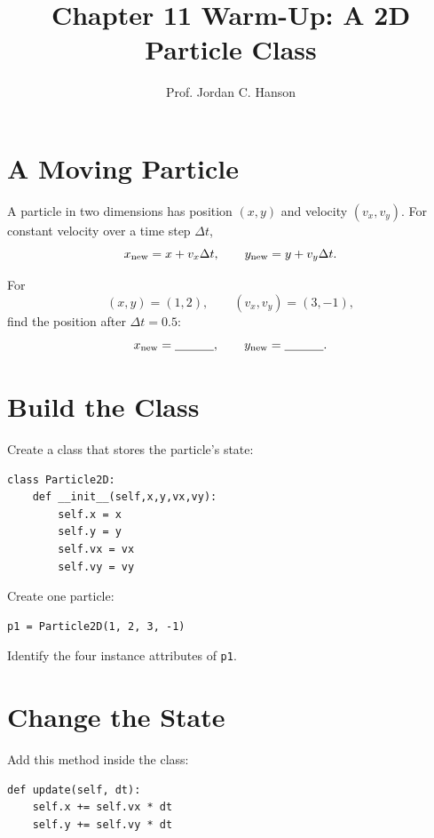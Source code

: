 \documentclass{article}
\begin{document}
\twocolumn

\title{Chapter 11 Warm-Up: A 2D Particle Class}
\author{Prof. Jordan C. Hanson}
\date{}

\maketitle

\section{A Moving Particle}

A particle in two dimensions has position \((x,y)\) and velocity
\((v_x,v_y)\).  For constant velocity over a time step \(\Delta t\),
\[
x_{\rm new}=x+v_x\Delta t,\qquad
y_{\rm new}=y+v_y\Delta t.
\]

For
\[
(x,y)=(1,2),\qquad (v_x,v_y)=(3,-1),
\]
find the position after \(\Delta t=0.5\):
\[
x_{\rm new}=\underline{\hspace{1.1cm}},\qquad
y_{\rm new}=\underline{\hspace{1.1cm}}.
\]

\section{Build the Class}

Create a class that stores the particle's state:

\begin{verbatim}
class Particle2D:
    def __init__(self,x,y,vx,vy):
        self.x = x
        self.y = y
        self.vx = vx
        self.vy = vy
\end{verbatim}

Create one particle:

\begin{verbatim}
p1 = Particle2D(1, 2, 3, -1)
\end{verbatim}

Identify the four instance attributes of \texttt{p1}.

\section{Change the State}

Add this method inside the class:

\begin{verbatim}
def update(self, dt):
    self.x += self.vx * dt
    self.y += self.vy * dt
\end{verbatim}
\end{document}

